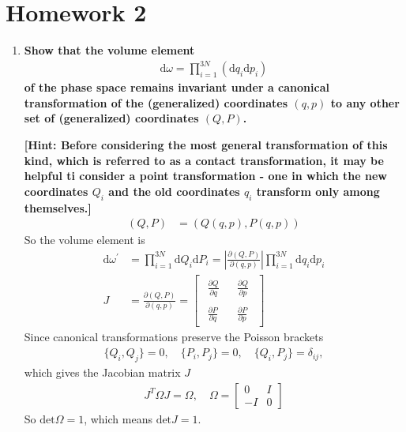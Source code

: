 \documentclass[../../main.tex]{subfiles}
\begin{document}
\section{Homework 2}
\begin{enumerate}
  \item \textbf{Show that the volume element 
  \begin{align*}
    \mathrm{d}\omega = \prod_{i=1}^{3N}(\mathrm{d}q_{i}\mathrm{d}p_{i})
  \end{align*}
  of the phase space remains invariant under a canonical transformation of the (generalized) coordinates $(q,p)$ to any other set of (generalized) coordinates $(Q,P)$.}

  \textbf{[Hint: Before considering the most general transformation of this kind, which is referred to as a contact transformation, it may be helpful ti consider a point transformation - one in which the new coordinates $Q_{i}$ and the old coordinates $q_{i}$ transform only among themselves.]}
  \begin{align*}
    (Q,P) &= (Q(q,p),P(q,p))
  \end{align*}
  So the volume element is 
  \begin{align*}
    \mathrm{d}\omega^{\prime} &= \prod_{i=1}^{3N}\mathrm{d}Q_{i}\mathrm{d}P_{i} = \left|\frac{\partial(Q,P)}{\partial(q,p)}\right|\prod_{i=1}^{3N}\mathrm{d}q_{i}\mathrm{d}p_{i}\\
    J &= \frac{\partial(Q,P)}{\partial(q,p)} = \begin{bmatrix}
      \begin{aligned}
        \frac{\partial Q}{\partial q}
      \end{aligned} & \begin{aligned}
        \frac{\partial Q}{\partial p}
      \end{aligned}\\
      \begin{aligned}
        \frac{\partial P}{\partial q}
      \end{aligned} & \begin{aligned}
        \frac{\partial P}{\partial p}
      \end{aligned}
    \end{bmatrix}
  \end{align*}
  Since canonical transformations preserve the Poisson brackets
  \begin{align*}
    \{Q_{i},Q_{j}\} = 0,\quad \{P_{i},P_{j}\} = 0,\quad \{Q_{i},P_{j}\} = \delta_{ij},
  \end{align*}
  which gives the Jacobian matrix $J$ 
  \begin{align*}
    J^{T}\Omega J = \Omega, \quad \Omega = \begin{bmatrix}
      0 & I\\
      -I & 0
    \end{bmatrix}
  \end{align*}
  So $\text{det} \Omega = 1$, which means $\text{det} J = 1$.


\end{enumerate}
\end{document}
